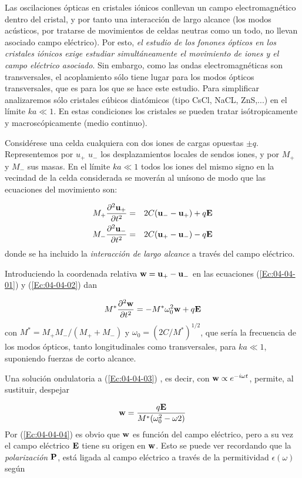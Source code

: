 Las oscilaciones ópticas en cristales iónicos conllevan un campo electromagnético dentro del cristal, y por tanto una interacción de largo alcance (los modos acústicos, por tratarse de movimientos de celdas neutras como un todo, no llevan asociado campo eléctrico). Por esto, \textit{el estudio de los fonones ópticos en los cristales iónicos exige estudiar simultáneamente el movimiento de iones y el campo eléctrico asociado}. Sin embargo, como las ondas electromagnéticas son transversales, el acoplamiento sólo tiene lugar para los modos ópticos transversales, que es para los que se hace este estudio. Para simplificar analizaremos sólo cristales cúbicos diatómicos (tipo CsCl, NaCL, ZnS,...) en el límite $ka\ll 1$. En estas condiciones los cristales se pueden tratar isótropicamente y macroscópicamente (medio continuo). 

Considérese una celda cualquiera con dos iones de cargas opuestas $\pm q$. Representemos por $u_+$ $u_-$ los desplazamientos locales de sendos iones, y por $M_+$ y $M_-$ sus masas. En el límite $ka\ll 1$ todos los iones del mismo signo en la vecindad de la celda considerada se moverán al unísono de modo que las ecuaciones del movimiento son:

\begin{eqnarray}
	M_+ \frac{\partial ^2 \mathbf{u}_+}{\partial t^2} & = & 2C(\mathbf{u}_- - \mathbf{u}_+) + q \mathbf{E} \label{Ec:04-04-01}\\
	M_- \frac{\partial ^2 \mathbf{u}_-}{\partial t^2} & = & 2C(\mathbf{u}_+ - \mathbf{u}_-) - q \mathbf{E} \label{Ec:04-04-02}
\end{eqnarray}
donde se ha incluido la \textit{interacción de largo alcance} a través del campo eléctrico. 

Introduciendo la coordenada relativa $\mathbf{w} = \mathbf{u}_+ - \mathbf{u}_-$ en las ecuaciones (\ref{Ec:04-04-01}) y (\ref{Ec:04-04-02}) dan

\begin{eqnarray}
	M^* \frac{\partial ^2 \mathbf{w}}{\partial t^2} = - M^*  \omega_0^2 \mathbf{w} + q \mathbf{E} \label{Ec:04-04-03}
\end{eqnarray}
con $M^*=M_+M_-/(M_++M_-)$ y $\omega_0=(2C/M^*)^{1/2}$, que sería la frecuencia de los modos ópticos, tanto longitudinales como transversales, para $ka\ll 1$, suponiendo fuerzas de corto alcance. 

Una solución ondulatoria a (\ref{Ec:04-04-03}) , es decir, con $\mathbf{w}\propto e^{-i\omega t}$, permite, al sustituir, despejar

\begin{eqnarray}
	\mathbf{w} = \frac{q\mathbf{E}}{M^* (\omega_0^2 - \omega2)}\label{Ec:04-04-04}
\end{eqnarray}
Por (\ref{Ec:04-04-04}) es obvio que $\mathbf{w}$ es función del campo eléctrico, pero a su vez el campo eléctrico $\mathbf{E}$ tiene su origen en $\mathbf{w}$. Esto se puede ver recordando que la \textit{polarización} $\mathbf{P}$, está ligada al campo eléctrico a través de la permitividad $\epsilon (\omega)$ según 

